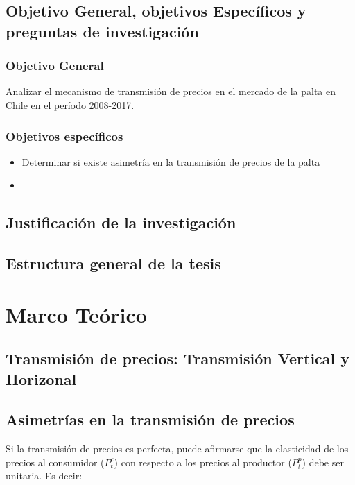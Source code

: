 \documentclass[12pt, twoside]{book}\usepackage[]{graphicx}\usepackage[]{color}
\numberwithin{equation}{section}
\numberwithin{theorem}{section}
\numberwithin{teorema}{section}
\numberwithin{defi}{section}
\numberwithin{prop}{section}
\numberwithin{defi}{section}
\theoremstyle{plain}
\begin{document}
\section{Objetivo General, objetivos Específicos y preguntas de investigación}
\subsection{Objetivo General}

Analizar el mecanismo de transmisión de precios en el mercado de la palta en Chile en el período 2008-2017. 

\subsection{Objetivos específicos}
\begin{itemize}
\item Determinar si existe asimetría en la transmisión de precios de la palta
\item 
\end{itemize}

\section{Justificación de la investigación}

\section{Estructura general de la tesis}



\chapter{Marco Teórico}

\section{Transmisión de precios: Transmisión Vertical y Horizonal}
\section{Asimetrías en la transmisión de precios}

Si la transmisión de precios es perfecta, puede afirmarse que la elasticidad de los precios al consumidor ($P_{t}^{c}$) con respecto a los precios al productor ($P_{t}^{p}$) debe ser unitaria. Es decir: 
\end{document}
